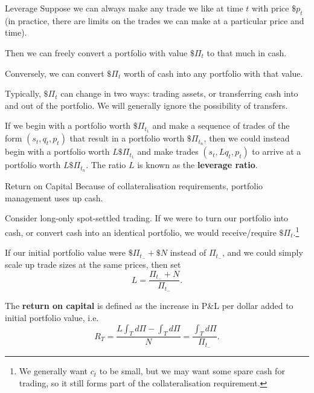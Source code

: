\documentclass{beamer}
\begin{document}
\begin{frame}{Leverage}
	Suppose we can always make any trade we like at time $t$ with price $\$p_t$ (in practice, there are limits on the trades we can make at a particular price and time). %

	Then we can freely convert a portfolio with value $\$\Pi_t$ to that much in cash.

	Conversely, we can convert $\$\Pi_t$ worth of cash into any portfolio with that value.

	\pause

	Typically, $\$\Pi_t$ can change in two ways: trading assets, or transferring cash into and out of the portfolio. We will generally ignore the possibility of transfers.

	If we begin with a portfolio worth $\$\Pi_{t_1}$ and make a sequence of trades of the form $(s_t,q_t,p_t)$ that result in a portfolio worth $\$\Pi_{t_n}$, then we could instead begin with a portfolio worth $L \$\Pi_{t_1}$ and make trades $(s_t, L q_t, p_t)$ to arrive at a portfolio worth $L \$\Pi_{t_n}$. The ratio $L$ is known as the \textbf{leverage ratio}.
\end{frame}

\begin{frame}{Return on Capital}
	Because of collateralisation requirements, portfolio management uses up cash.

	Consider long-only spot-settled trading. If we were to turn our portfolio into cash, or convert cash into an identical portfolio, we would receive/require $\$\Pi_t$.\footnote{We generally want $c_t$ to be small, but we may want some spare cash for trading, so it still forms part of the collateralisation requirement.}%


	If our initial portfolio value were $\$\Pi_{t_-}+\$N$ instead of $\Pi_{t_-}$, and we could simply scale up trade sizes at the same prices, then set
	$$L = \frac{\Pi_{t_-}+N}{\Pi_{t_-}}.$$

	The \textbf{return on capital} is defined as the increase in P\&L per dollar added to initial portfolio value, i.e.
	$$R_T = \frac{L \int_T d\Pi - \int_T d\Pi}{N} = \frac{\int_T d\Pi}{\Pi_{t_-}}.$$
\end{frame}
\end{document}
